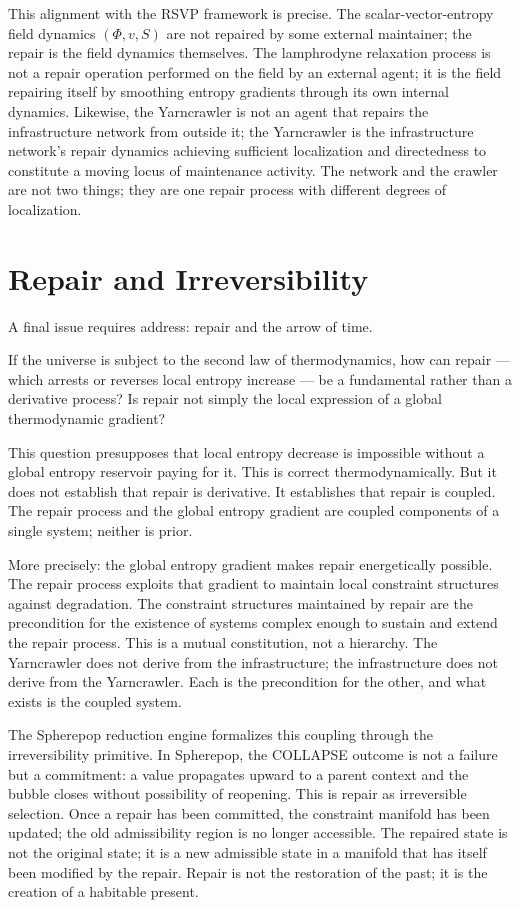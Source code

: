 \documentclass[11pt, a4paper]{article}
\theoremstyle{definition}
\theoremstyle{remark}
\begin{document}
This alignment with the RSVP framework is precise. The scalar-vector-entropy
field dynamics $(\Phi, v, S)$ are not repaired by some external maintainer;
the repair is the field dynamics themselves. The lamphrodyne relaxation process
is not a repair operation performed on the field by an external agent; it is the
field repairing itself by smoothing entropy gradients through its own internal
dynamics. Likewise, the Yarncrawler is not an agent that repairs the
infrastructure network from outside it; the Yarncrawler is the infrastructure
network's repair dynamics achieving sufficient localization and directedness to
constitute a moving locus of maintenance activity. The network and the crawler
are not two things; they are one repair process with different degrees of
localization.

\section{Repair and Irreversibility}

A final issue requires address: repair and the arrow of time.

If the universe is subject to the second law of thermodynamics, how can repair
--- which arrests or reverses local entropy increase --- be a fundamental rather
than a derivative process? Is repair not simply the local expression of a global
thermodynamic gradient?

This question presupposes that local entropy decrease is impossible without
a global entropy reservoir paying for it. This is correct thermodynamically.
But it does not establish that repair is derivative. It establishes that repair
is coupled. The repair process and the global entropy gradient are coupled
components of a single system; neither is prior.

More precisely: the global entropy gradient makes repair energetically possible.
The repair process exploits that gradient to maintain local constraint structures
against degradation. The constraint structures maintained by repair are the
precondition for the existence of systems complex enough to sustain and extend
the repair process. This is a mutual constitution, not a hierarchy. The
Yarncrawler does not derive from the infrastructure; the infrastructure does not
derive from the Yarncrawler. Each is the precondition for the other, and what
exists is the coupled system.

The Spherepop reduction engine formalizes this coupling through the
irreversibility primitive. In Spherepop, the COLLAPSE outcome is not a failure
but a commitment: a value propagates upward to a parent context and the bubble
closes without possibility of reopening. This is repair as irreversible
selection. Once a repair has been committed, the constraint manifold has been
updated; the old admissibility region is no longer accessible. The repaired
state is not the original state; it is a new admissible state in a manifold
that has itself been modified by the repair. Repair is not the restoration of
the past; it is the creation of a habitable present.
\end{document}
